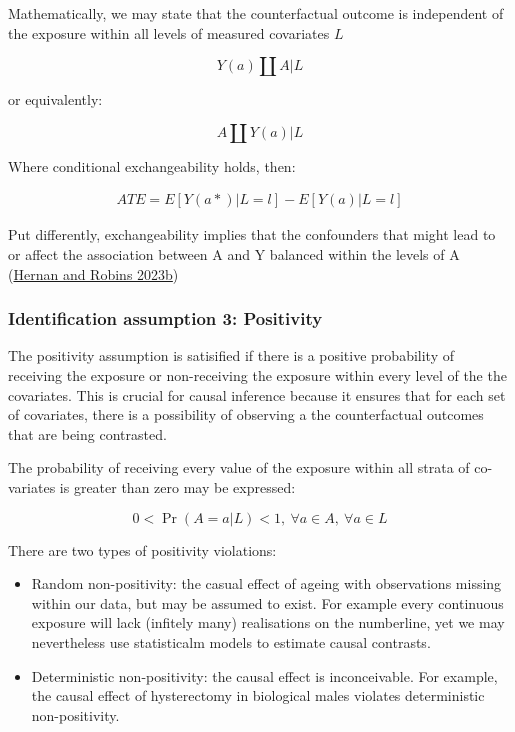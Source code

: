 \documentclass[
  singlecolumn]{report}
\begin{document}
Mathematically, we may state that the counterfactual outcome is
independent of the exposure within all levels of measured covariates
\(L\)

\[Y(a)\coprod  A|L\]

or equivalently:

\[A \coprod  Y(a)|L\]

Where conditional exchangeability holds, then:

\[
\begin{aligned}
ATE = E[Y(a*)|L = l] - E[Y(a)|L = l] 
\end{aligned}
\]

Put differently, exchangeability implies that the confounders that might
lead to or affect the association between A and Y balanced within the
levels of A (\protect\hyperlink{ref-hernan2023a}{Hernan and Robins
2023b})

\hypertarget{identification-assumption-3-positivity}{%
\subsubsection{Identification assumption 3:
Positivity}\label{identification-assumption-3-positivity}}

The positivity assumption is satisified if there is a positive
probability of receiving the exposure or non-receiving the exposure
within every level of the the covariates. This is crucial for causal
inference because it ensures that for each set of covariates, there is a
possibility of observing a the counterfactual outcomes that are being
contrasted.

The probability of receiving every value of the exposure within all
strata of co-variates is greater than zero may be expressed:

\begin{equation}
0 < \Pr(A=a|L)<1, ~ \forall a \in A, ~ \forall a \in L
\end{equation}

There are two types of positivity violations:

\begin{itemize}
\item
  Random non-positivity: the casual effect of ageing with observations
  missing within our data, but may be assumed to exist. For example
  every continuous exposure will lack (infitely many) realisations on
  the numberline, yet we may nevertheless use statisticalm models to
  estimate causal contrasts.
\item
  Deterministic non-positivity: the causal effect is inconceivable. For
  example, the causal effect of hysterectomy in biological males
  violates deterministic non-positivity.
\end{itemize}
\end{document}
